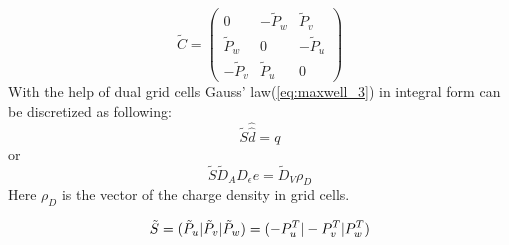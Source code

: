 \begin{equation}
\tilde{C}=
	\begin{pmatrix}
	0&-\tilde{P}_{w}&\tilde{P}_{v}\\
	\tilde{P}_{w}&0&-\tilde{P}_{u}\\
	-\tilde{P}_{v}&\tilde{P}_{u}&0
	\end{pmatrix}
	\label{eq:dual_C_matrix}
\end{equation}
With the help of dual grid cells Gauss' law(\ref{eq:maxwell_3}) in integral form can be discretized\cite{script_FeldSim} as following:
\begin{equation}
\tilde{S}\widehat{\widehat{d}}=q
\label{eq:gausslaw}
\end{equation}
or
\begin{equation}
\tilde{S}\tilde{D}_{A}D_{\epsilon}e=\tilde{D}_{V}\rho_{D}
\label{eq:gausslaw_sample}
\end{equation}
Here $\rho_{D}$ is the vector of the charge density in grid cells.

\begin{equation}
\tilde{S}=(\tilde{P}_{u}|\tilde{P}_{v}|\tilde{P}_{w})=(-P_{u}^{T}|-P_{v}^{T}|\-P_{w}^{T})
\label{eq:dual_S_matrix}
\end{equation}



